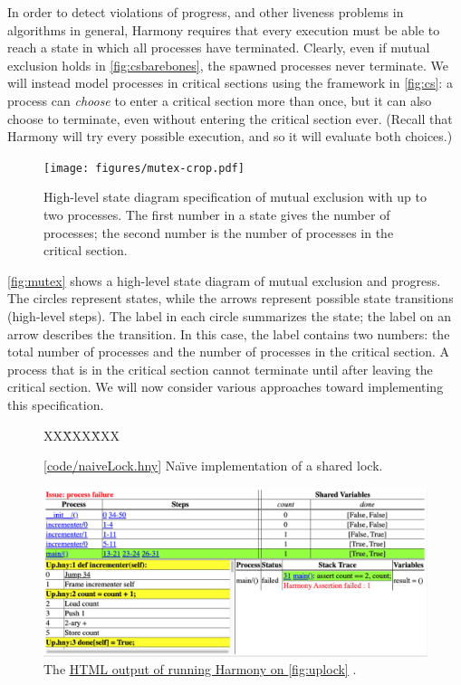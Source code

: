 \documentclass{report}
\newcommand{\harmonysource}[1]{
\begin{tabbing}
XX\=XXX\=XXX\kill
    
\end{tabbing}
}
\newcommand{\harmonylink}[1]{%
[\href{https://www.cs.cornell.edu/home/rvr/harmony/#1}{\underline{#1}}]%
}
\newcommand{\harmonyref}[2]{%
\href{https://www.cs.cornell.edu/home/rvr/harmony/output/#1}{\underline{#2}}%
}
\newenvironment{code}{
\tcolorbox
}{
\endtcolorbox
}
\begin{document}
In order to detect violations of progress, and other liveness problems in
algorithms in general, Harmony requires that every execution must be
able to reach a state in which all processes have terminated.
Clearly, even if mutual exclusion holds in \autoref{fig:csbarebones},
the spawned processes never terminate.  We
will instead model processes in critical sections using the framework in
\autoref{fig:cs}: a process can \emph{choose} to enter a
critical section more than once, but it can also choose to terminate, even
without entering the critical section ever.
(Recall that Harmony will try every possible execution, and so it will evaluate
both choices.)

\begin{figure}
\begin{center}
\texttt{[image: figures/mutex-crop.pdf]}
\end{center}
\caption{High-level state diagram specification of mutual exclusion with up to two processes.
The first number in a state gives the number of processes; the second number is the
number of processes in the critical section.}
\label{fig:mutex}
\end{figure}

\autoref{fig:mutex} shows a high-level state diagram
%
of mutual exclusion and progress.
The circles represent states, while the arrows represent possible state
transitions (high-level steps).  The label in each circle summarizes the state;
the label on an arrow describes the transition.  In this case,
the label contains two numbers: the total number of processes and the number
of processes in the critical section.  A process that is in the critical
section cannot terminate until after leaving the critical section.
We will now consider various approaches toward implementing this
specification.

\begin{figure}
\begin{code}
\harmonysource{naiveLock}
\end{code}
\caption{\harmonylink{code/naiveLock.hny} Na\"{\i}ve implementation of a shared lock.}
\label{fig:uplock}
\end{figure}

\begin{figure}
\includegraphics[width=\textwidth]{figures/naiveLock.png}
\caption{The \harmonyref{naiveLock.html}{HTML output of running Harmony on \autoref{fig:uplock}}.}
\label{fig:naiveLockhtml}
\end{figure}
\end{document}

